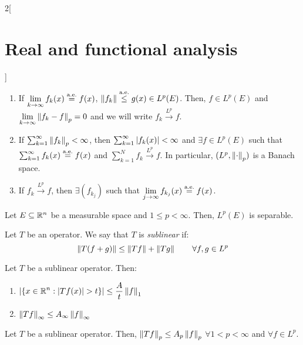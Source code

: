 \documentclass[../../../main_math.tex]{subfiles}
\begin{document}
\begin{multicols}{2}[\section{Real and functional analysis}]
\begin{theorem}
\begin{enumerate}
      \item If $\displaystyle\lim_{k\to\infty}f_k(x)\overset{\text{a.e.}}{=}{f}(x)$, $\left\|{f}_k\right\|\overset{\text{a.e.}}{\leq} g(x)\in L^p(E)$. Then, ${f}\in L^p(E)$ and $\displaystyle\lim_{k\to\infty}\left\|{f}_k-{f}\right\|_p=0$ and we will write ${f}_k\overset{L^p}{\rightarrow}{f}$.
      \item If $\sum_{k=1}^\infty\left\|{f}_k\right\|_p<\infty$, then $\sum_{k=1}^\infty\abs{f_k(x)}<\infty$ and $\exists f\in L^p(E)$ such that $\sum_{k=1}^\infty f_k(x)\overset{\text{a.e.}}{=}f(x)$ and $\sum_{k=1}^N{f}_k\overset{L^p}{\rightarrow}{f}$. In particular, $(L^p,\left\|\cdot\right\|_p)$ is a Banach space.
      \item If ${f}_k\overset{L^p}{\rightarrow}{f}$, then $\exists(f_{k_j})$ such that $\displaystyle\lim_{j\to\infty}f_{k_j}(x)\overset{\text{a.e.}}{=}{f}(x)$.
    \end{enumerate}
  \end{theorem}
  \begin{theorem}
    Let $E\subseteq\mathbb{R}^n$ be a measurable space and $1\leq p<\infty$. Then, $L^p(E)$ is separable.
  \end{theorem}
  \begin{definition}
    Let $T$ be an operator. We say that $T$ is \emph{sublinear} if: $$\left\|T(f+g)\right\|\leq \left\|Tf\right\|+\left\|Tg\right\|\qquad\forall f,g\in L^p$$
  \end{definition}
  \begin{theorem}
    Let $T$ be a sublinear operator. Then:
    \begin{enumerate}
      \item $\displaystyle\m{\{x\in\RR^n:\abs{Tf(x)}>t\}}\leq \frac{A}{t}\norm{f}_1$
      \item $\left\|Tf\right\|_\infty\leq A_\infty\left\|f\right\|_\infty$
    \end{enumerate}
  \end{theorem}
  \begin{corollary}
    Let $T$ be a sublinear operator. Then, $\left\|Tf\right\|_p\leq A_p\left\|f\right\|_p$ $\forall 1<p<\infty$ and $\forall f\in L^p$.
  \end{corollary}

\end{multicols}
\end{document}
